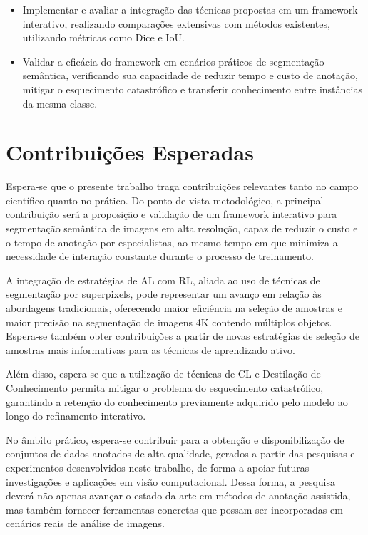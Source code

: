 \begin{itemize}

\item Implementar e avaliar a integração das técnicas propostas em um framework interativo, realizando comparações extensivas com métodos existentes, utilizando métricas como Dice e \ac{IoU}.

\item Validar a eficácia do framework em cenários práticos de segmentação semântica, verificando sua capacidade de reduzir tempo e custo de anotação, mitigar o esquecimento catastrófico e transferir conhecimento entre instâncias da mesma classe.

\end{itemize}

\section{Contribuições Esperadas}

Espera-se que o presente trabalho traga contribuições relevantes tanto no campo científico quanto no prático. Do ponto de vista metodológico, a principal contribuição será a proposição e validação de um framework interativo para segmentação semântica de imagens em alta resolução, capaz de reduzir o custo e o tempo de anotação por especialistas, ao mesmo tempo em que minimiza a necessidade de interação constante durante o processo de treinamento.

A integração de estratégias de \ac{AL} com \ac{RL}, aliada ao uso de técnicas de segmentação por superpixels, pode representar um avanço em relação às abordagens tradicionais, oferecendo maior eficiência na seleção de amostras e maior precisão na segmentação de imagens 4K contendo múltiplos objetos. Espera-se também obter contribuições a partir de novas estratégias de seleção de amostras mais informativas para as técnicas de aprendizado ativo.

Além disso, espera-se que a utilização de técnicas de \ac{CL} e Destilação de Conhecimento permita mitigar o problema do esquecimento catastrófico, garantindo a retenção do conhecimento previamente adquirido pelo modelo ao longo do refinamento interativo.

No âmbito prático, espera-se contribuir para a obtenção e disponibilização de conjuntos de dados anotados de alta qualidade, gerados a partir das pesquisas e experimentos desenvolvidos neste trabalho, de forma a apoiar futuras investigações e aplicações em visão computacional. Dessa forma, a pesquisa deverá não apenas avançar o estado da arte em métodos de anotação assistida, mas também fornecer ferramentas concretas que possam ser incorporadas em cenários reais de análise de imagens.

